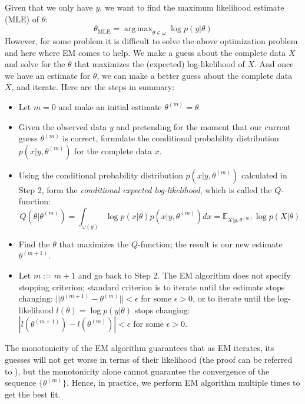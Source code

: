 Given that we only have $y$, we want to find the maximum likelihood estimate (MLE) of $\theta$:
\begin{equation*}
\theta_{\text{MLE}} = \operatorname{arg\,max}_{\theta \in \omega} \log p(y|\theta)
\end{equation*}
However, for some problem it is difficult to solve the above optimization problem and here where EM comes to help. We make a guess about the complete data $X$ and solve for the $\theta$ that maximizes the (expected) log-likelihood of $X$. And once we have an estimate for $\theta$, we can make a better guess about the complete data $X$, and iterate. Here are the steps in summary:
\begin{itemize}
	\item Let $m=0$ and make an initial estimate $\theta^{(m)}=\theta$.
	\item Given the observed data $y$ and pretending for the moment that our current guess $\theta^{(m)}$ is correct, formulate the conditional probability distribution $p(x|y, \theta^{(m)})$ for the complete data $x$.
	\item Using the conditional probability distribution $p(x|y, \theta^{(m)})$ calculated in Step 2, form the \textit{conditional expected log-likelihood}, which is called the $Q$-function:
	\begin{equation*}
	Q(\theta|\theta^{(m)}) = \int_{\omega (y)} \log p(x|\theta)p(x|y, \theta^{(m)})dx = \mathbb{E}_{X|y,\theta^{(m)}} \log p(X|\theta)
	\end{equation*}
	\item Find the $\theta$ that maximizes the $Q$-function; the result is our new estimate $\theta^{(m+1)}$.
	\item Let $m:=m+1$ and go back to Step 2. The EM algorithm does not specify stopping criterion; standard criterion is to iterate until the estimate stops changing: $||\theta^{(m+1)}-\theta^{(m)}|| < \epsilon$ for some $\epsilon>0$, or to iterate until the log-likelihood $l(\theta) = \log p(y|\theta)$ stops changing: $|l(\theta^{(m+1)})-l(\theta^{(m)})|<\epsilon$ for some $\epsilon>0$.
\end{itemize}

The monotonicity of the EM algorithm guarantees that as EM iterates, its guesses will not get worse in terms of their likelihood (the proof can be referred to \cite{Bishop2013}), but the monotonicity alone cannot guarantee the convergence of the sequence $\{\theta^{(m)}\}$. Hence, in practice, we perform EM algorithm multiple times to get the best fit. 


